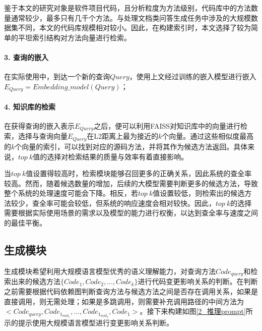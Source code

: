 鉴于本文的研究对象是软件项目代码，且分析粒度为方法级别，代码库中的方法数量通常较少，最多只有几千个方法。与处理文档类问答生成任务中涉及的大规模数据集不同，本文的代码库规模相对较小。因此，在构建索引时，本文选择了较为简单的平坦索引结构对方法向量进行检索。

\paragraph{3. 查询的嵌入}

在实际使用中，到达一个新的查询$Query$，使用上文经过训练的嵌入模型进行嵌入$E_{Query}=Embedding\_model(Query)$；

\paragraph{4. 知识库的检索}

在获得查询的嵌入表示$E_{Query}$之后，便可以利用FAISS对知识库中的向量进行检索，选择与查询向量$E_{Query}$在L2距离上最为接近的$k$个向量。通过这些相似度最高的$k$个向量的索引，可以找到对应的源码方法，并将其作为候选方法返回。具体来说，$top\ k$值的选择对检索结果的质量与效率有着直接影响。

当$top\ k$值设置得较高时，检索模块能够召回更多的正确关系，因此系统的查全率较高。然而，随着候选数量的增加，后续的大模型需要判断更多的候选方法，导致整个系统的处理速度可能会下降。相反，若$top\ k$值设置较低，则检索出的候选方法较少，查全率可能会较低，但系统的响应速度会相对较快。因此，$top\ k$的选择需要根据实际使用场景的需求以及模型的能力进行权衡，以达到查全率与速度之间的最佳平衡。


\subsection{生成模块}

生成模块希望利用大规模语言模型优秀的语义理解能力，对查询方法$Code_{query}$和检索出来的候选方法$\{Code_1,Code_2,...,Code_k\}$进行代码变更影响关系的判断。在判断之前需要根据代码依赖图判断查询方法与候选方法之间是否存在调用关系，如果是直接调用，则无需处理；如果是多跳调用，则需要补充调用路径的中间方法为$<Code_{query},Code_{1_{mid_1}},...,Code_{1_{mid_2}},Code_1>$。接下来构建如图\ref{2_推理prompt}所示的提示使用大规模语言模型进行变更影响关系判断。

